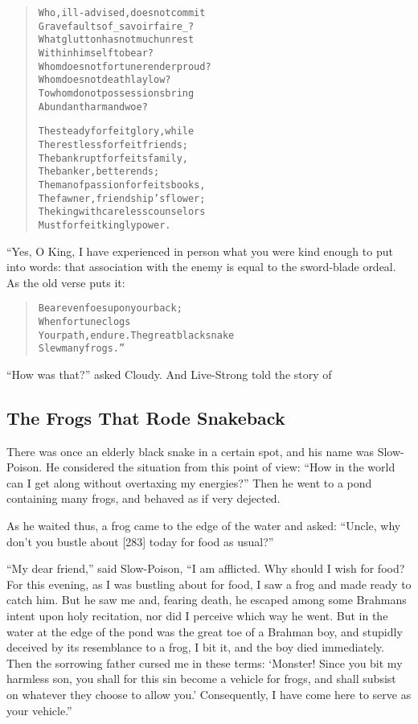 \documentclass[article, twoside, 14pt]{memoir}
\renewenvironment{verbatim}{%
\begin{quote}%
\vskip -10pt%
\begin{alltt}\normalfont\large}{\end{alltt}%
\end{quote}%
\vskip -10pt
} %
\begin{document}
\begin{verbatim}
Who, ill-advised, does not commit
    Grave faults of _savoir faire_?
What glutton has not much unrest
    Within himself to bear?
Whom does not fortune render proud?
    Whom does not death lay low?
To whom do not possessions bring
    Abundant harm and woe?

The steady forfeit glory, while
    The restless forfeit friends;
The bankrupt forfeits family,
    The banker, better ends;
The man of passion forfeits books,
    The fawner, friendship's flower;
The king with careless counselors
    Must forfeit kingly power.
\end{verbatim}
“Yes, O King, I have experienced in person what you were kind
enough to put into words: that association with the enemy is equal
to the sword-blade ordeal. As the old verse puts it:

\begin{verbatim}
Bear even foes upon your back;
    When fortune clogs
Your path, endure. The great black snake
    Slew many frogs.”
\end{verbatim}
``How was that?'' asked Cloudy. And Live-Strong told the story of

\subsection{The Frogs That Rode Snakeback}

\label{s63}

There was once an elderly black snake in a certain spot, and his
name was Slow-Poison. He considered the situation from this point
of view:
``How in the world can I get along without overtaxing my energies?''
Then he went to a pond containing many frogs, and behaved as if
very dejected.

As he waited thus, a frog came to the edge of the water and asked:
``Uncle, why don't you bustle about [283] today for food as usual?''

``My dear friend,'' said Slow-Poison,
``I am afflicted. Why should I wish for food? For this evening, as I was bustling about for food, I saw a frog and made ready to catch him. But he saw me and, fearing death, he escaped among some Brahmans intent upon holy recitation, nor did I perceive which way he went. But in the water at the edge of the pond was the great toe of a Brahman boy, and stupidly deceived by its resemblance to a frog, I bit it, and the boy died immediately. Then the sorrowing father cursed me in these terms: `Monster! Since you bit my harmless son, you shall for this sin become a vehicle for frogs, and shall subsist on whatever they choose to allow you.' Consequently, I have come here to serve as your vehicle.''
\end{document}
